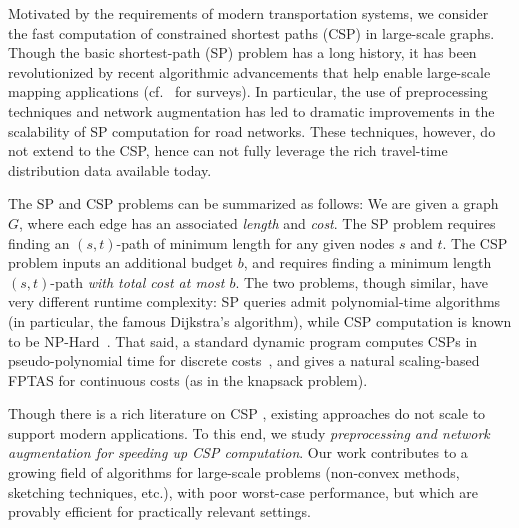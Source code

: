 Motivated by the requirements of modern transportation systems, we consider the fast computation of constrained shortest paths (CSP) in large-scale graphs. 
Though the basic shortest-path (SP) problem has a long history, it has been revolutionized by recent algorithmic advancements that help enable large-scale mapping applications (cf.~\citep{goldberg_survey,dimacs09} for surveys).
In particular, the use of preprocessing techniques and network augmentation has led to dramatic improvements in the scalability of SP computation for road networks.
These techniques, however, do not extend to the CSP, hence can not fully leverage the rich travel-time distribution data available today.

The SP and CSP problems can be summarized as follows: 
We are given a graph $G$, where each edge has an associated \emph{length} and \emph{cost}. 
The SP problem requires finding an $(s,t)$-path of minimum length for any given nodes $s$ and $t$. 
The CSP problem inputs an additional budget $b$, and requires finding a minimum length $(s,t)$-path \emph{with total cost at most $b$}.
The two problems, though similar, have very different runtime complexity: SP queries admit polynomial-time algorithms (in particular, the famous Dijkstra's algorithm), while CSP computation is known to be NP-Hard~\citep{csp_survey}.
That said, a standard dynamic program computes CSPs in pseudo-polynomial time for discrete costs~\citep{alex_bicriteria}, and gives a natural scaling-based FPTAS for continuous costs (as in the knapsack problem).

Though there is a rich literature on CSP \citep{csp_survey}, existing approaches do not scale to support modern applications. 
To this end, we study \emph{preprocessing and network augmentation for speeding up CSP computation}.
Our work contributes to a growing field of algorithms for large-scale problems (non-convex methods, sketching techniques, etc.), with poor worst-case performance, but which are provably efficient for practically relevant settings.

